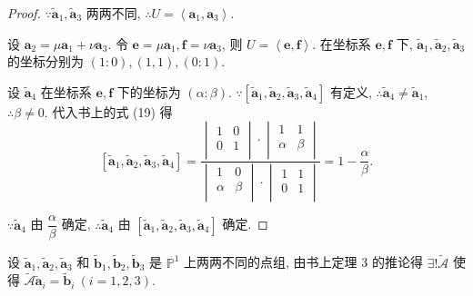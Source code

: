 \documentclass[color=black,device=normal,lang=cn,mode=geye]{elegantnote}
\begin{document}
\begin{proof}
    $\because\tilde{\boldsymbol{a}}_1,\tilde{\boldsymbol{a}}_3$ 两两不同, $\therefore U=\left<\boldsymbol{a}_1,\boldsymbol{a}_3\right>$.
    
    设 $\boldsymbol{a}_2=\mu\boldsymbol{a}_1+\nu\boldsymbol{a}_3$. 令 $\boldsymbol{e}=\mu\boldsymbol{a}_1,\boldsymbol{f}=\nu\boldsymbol{a}_3$, 则 $U=\left<\boldsymbol{e},\boldsymbol{f}\right>$. 在坐标系 $\boldsymbol{e},\boldsymbol{f}$ 下, $\tilde{\boldsymbol{a}}_1,\tilde{\boldsymbol{a}}_2,\tilde{\boldsymbol{a}}_3$ 的坐标分别为 $(1:0),(1,1),(0:1)$.
    
    设 $\tilde{\boldsymbol{a}}_4$ 在坐标系 $\boldsymbol{e},\boldsymbol{f}$ 下的坐标为 $(\alpha:\beta)$. $\because[\tilde{\boldsymbol{a}}_1,\tilde{\boldsymbol{a}}_2,\tilde{\boldsymbol{a}}_3,\tilde{\boldsymbol{a}}_4]$ 有定义, $\therefore\tilde{\boldsymbol{a}}_4\neq\tilde{\boldsymbol{a}}_1$, $\therefore\beta\neq0$. 代入书上的式 (19) 得
    \[[\tilde{\boldsymbol{a}}_1,\tilde{\boldsymbol{a}}_2,\tilde{\boldsymbol{a}}_3,\tilde{\boldsymbol{a}}_4]=\dfrac{\begin{vmatrix}
        1 & 0 \\
        0 & 1 \\
    \end{vmatrix}\cdot\begin{vmatrix}
        1 & 1 \\
        \alpha & \beta \\
    \end{vmatrix}}{\begin{vmatrix}
        1 & 0 \\
        \alpha & \beta \\
    \end{vmatrix}\cdot\begin{vmatrix}
        1 & 1 \\
        0 & 1 \\
    \end{vmatrix}}=1-\dfrac{\alpha}{\beta}.\]

    $\because\tilde{\boldsymbol{a}}_4$ 由 $\dfrac{\alpha}{\beta}$ 确定, $\therefore\tilde{\boldsymbol{a}}_4$ 由 $[\tilde{\boldsymbol{a}}_1,\tilde{\boldsymbol{a}}_2,\tilde{\boldsymbol{a}}_3,\tilde{\boldsymbol{a}}_4]$ 确定.
\end{proof}
设 $\tilde{\boldsymbol{a}}_1,\tilde{\boldsymbol{a}}_2,\tilde{\boldsymbol{a}}_3$ 和 $\tilde{\boldsymbol{b}}_1,\tilde{\boldsymbol{b}}_2,\tilde{\boldsymbol{b}}_3$ 是 $\mathbb{P}^1$ 上两两不同的点组, 由书上定理 3 的推论得 $\exists!\widetilde{\mathcal{A}}$ 使得 $\widetilde{\mathcal{A}}\tilde{\boldsymbol{a}}_i=\tilde{\boldsymbol{b}}_i\ (i=1,2,3)$.
\end{document}
